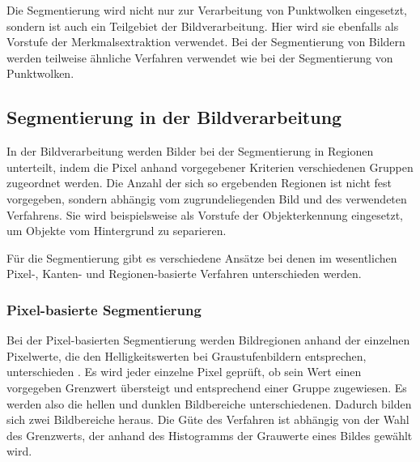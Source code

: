 Die Segmentierung wird nicht nur zur Verarbeitung von Punktwolken eingesetzt, sondern ist auch ein Teilgebiet der  Bildverarbeitung. Hier wird sie ebenfalls als Vorstufe der Merkmalsextraktion verwendet. Bei der Segmentierung von Bildern werden teilweise ähnliche Verfahren verwendet wie bei der Segmentierung von Punktwolken. 

\subsection[Segmentierung in der Bildverarbeitung (Schmelzer)]{Segmentierung in der Bildverarbeitung}

In der Bildverarbeitung werden Bilder bei der Segmentierung in Regionen unterteilt, indem die Pixel anhand vorgegebener Kriterien verschiedenen Gruppen zugeordnet werden. Die Anzahl der sich so ergebenden Regionen ist nicht fest vorgegeben, sondern abhängig vom zugrundeliegenden Bild und des verwendeten Verfahrens. Sie wird beispielsweise als Vorstufe der Objekterkennung eingesetzt, um Objekte vom Hintergrund zu separieren. 

Für die Segmentierung gibt es verschiedene Ansätze bei denen im wesentlichen Pixel-, Kanten- und Regionen-basierte Verfahren unterschieden werden.

\subsubsection[Pixel-basierte Segmentierung (Schmelzer)]{Pixel-basierte Segmentierung}

Bei der Pixel-basierten Segmentierung werden Bildregionen anhand der  einzelnen Pi\-xel\-wer\-te, die den Helligkeitswerten bei Graustufenbildern entsprechen, unterschieden \cite{Jaehne2012}. Es wird jeder einzelne Pixel geprüft, ob sein Wert einen vorgegeben Grenzwert übersteigt und  entsprechend einer Gruppe zugewiesen. Es werden also die hellen und dunklen Bildbereiche unterschiedenen. Dadurch bilden sich zwei Bild\-be\-rei\-che heraus. Die Güte des Verfahren ist abhängig von der Wahl des  Grenzwerts, der anhand des Histogramms der Grauwerte eines Bildes gewählt wird. 

